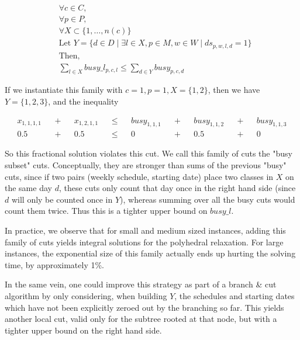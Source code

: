 \begin{align*}
&\forall c \in C,\\
&\forall p \in P,\\
&\forall X \subset \{1, \dots, n(c)\}\\
&\text{Let }Y = \{d \in D \mid \exists l \in X, p \in M, w \in W \mid ds_{p, w, l, d} = 1\}\\
&\text{Then, }\\
&\sum_{l \in X} busy\_l_{p, c, l} \le \sum_{d \in Y} busy_{p, c, d}
\end{align*}

If we instantiate this family with $c = 1, p = 1, X = \{1, 2\}$, then we have $Y = \{1, 2, 3\}$, and the inequality

\begin{align*}
&x_{1, 1, 1, 1}& &+& &x_{1, 2, 1, 1}& &\le& &busy_{1, 1, 1}& &+& &busy_{1, 1, 2}& &+& &busy_{1, 1, 3}&\\
&0.5& &+& &0.5& &\le& &0& &+& &0.5& &+& &0&
\end{align*}

So this fractional solution violates this cut. We call this family of cuts the "busy subset" cuts. Conceptually, they are stronger than sums of the previous "busy" cuts, since if two pairs (weekly schedule, starting date) place two classes in $X$ on the same day $d$, these cuts only count that day once in the right hand side (since $d$ will only be counted once in $Y$), whereas summing over all the busy cuts would count them twice. Thus this is a tighter upper bound on $busy\_l$.

In practice, we observe that for small and medium sized instances, adding this family of cuts yields integral solutions for the polyhedral relaxation. For large instances, the exponential size of this family actually ends up hurting the solving time, by approximately 1\%.

In the same vein, one could improve this strategy as part of a branch \& cut algorithm by only considering, when building $Y$, the schedules and starting dates which have not been explicitly zeroed out by the branching so far. This yields another local cut, valid only for the subtree rooted at that node, but with a tighter upper bound on the right hand side.
